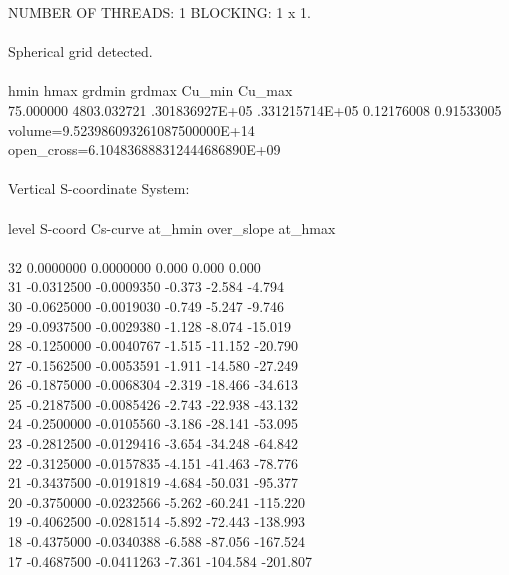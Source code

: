 NUMBER OF THREADS:  1 BLOCKING:  1 x  1.\\
\\
Spherical grid detected.\\
\\
hmin        hmax         grdmin         grdmax         Cu\_min      Cu\_max\\
75.000000  4803.032721 .301836927E+05 .331215714E+05  0.12176008  0.91533005\\
volume=9.523986093261087500000E+14   open\_cross=6.104836888312444686890E+09\\
\\
Vertical S-coordinate System:\\
\\
level   S-coord     Cs-curve          at\_hmin  over\_slope     at\_hmax\\
\\
32   0.0000000   0.0000000           0.000       0.000       0.000\\
31  -0.0312500  -0.0009350          -0.373      -2.584      -4.794\\
30  -0.0625000  -0.0019030          -0.749      -5.247      -9.746\\
29  -0.0937500  -0.0029380          -1.128      -8.074     -15.019\\
28  -0.1250000  -0.0040767          -1.515     -11.152     -20.790\\
27  -0.1562500  -0.0053591          -1.911     -14.580     -27.249\\
26  -0.1875000  -0.0068304          -2.319     -18.466     -34.613\\
25  -0.2187500  -0.0085426          -2.743     -22.938     -43.132\\
24  -0.2500000  -0.0105560          -3.186     -28.141     -53.095\\
23  -0.2812500  -0.0129416          -3.654     -34.248     -64.842\\
22  -0.3125000  -0.0157835          -4.151     -41.463     -78.776\\
21  -0.3437500  -0.0191819          -4.684     -50.031     -95.377\\
20  -0.3750000  -0.0232566          -5.262     -60.241    -115.220\\
19  -0.4062500  -0.0281514          -5.892     -72.443    -138.993\\
18  -0.4375000  -0.0340388          -6.588     -87.056    -167.524\\
17  -0.4687500  -0.0411263          -7.361    -104.584    -201.807\\
